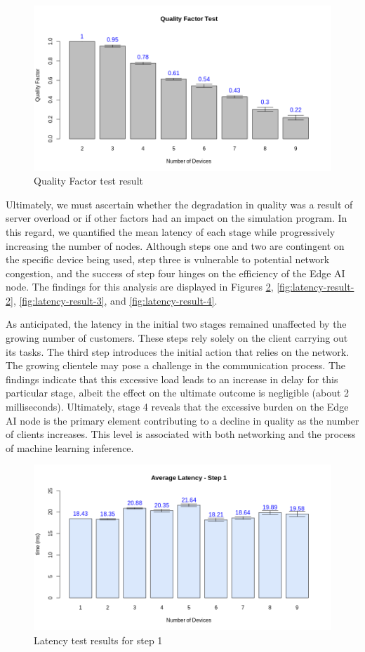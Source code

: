 \begin{figure}[h!]
    \centering
    \includegraphics[width = .8\linewidth]{Figures/qf-test.png}
    \caption{Quality Factor test result}
    \label{fig:qf-result}
\end{figure}

Ultimately, we must ascertain whether the degradation in quality was a result of server overload or if other factors had an impact on the simulation program. In this regard, we quantified the mean latency of each stage while progressively increasing the number of nodes. Although steps one and two are contingent on the specific device being used, step three is vulnerable to potential network congestion, and the success of step four hinges on the efficiency of the Edge AI node. The findings for this analysis are displayed in Figures \ref{fig:latency-result-1}, \ref{fig:latency-result-2}, \ref{fig:latency-result-3}, and \ref{fig:latency-result-4}.

As anticipated, the latency in the initial two stages remained unaffected by the growing number of customers. These steps rely solely on the client carrying out its tasks. The third step introduces the initial action that relies on the network. The growing clientele may pose a challenge in the communication process. The findings indicate that this excessive load leads to an increase in delay for this particular stage, albeit the effect on the ultimate outcome is negligible (about 2 milliseconds). Ultimately, stage 4 reveals that the excessive burden on the Edge AI node is the primary element contributing to a decline in quality as the number of clients increases. This level is associated with both networking and the process of machine learning inference.

\begin{figure}[h!]
    \centering
    \includegraphics[width = .8\linewidth]{Figures/latency-st1.png}
    \caption{Latency test results for step 1}
    \label{fig:latency-result-1}
\end{figure}

